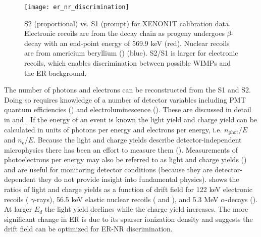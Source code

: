 \begin{figure}
\centering
\texttt{[image: er\_nr\_discrimination]}
\caption[S2 (proportional) vs. S1 (prompt) for XENON1T  and \ambe calibration data.  S2/S1 is larger for electronic recoils,
which enables discrimination
between possible WIMPs and the ER background.]{S2 (proportional) vs. S1 (prompt) for XENON1T calibration data.  Electronic recoils are from
the  decay chain as
progeny  undergoes $\beta$-decay with an end-point energy of 569.9 keV (red).  Nuclear
recoils are from americium beryllium () (blue).  S2/S1 is larger for electronic recoils, which enables discrimination
between possible WIMPs and the ER background.}
\label{fig:tpcs_signals_ernr}
\end{figure}

The number of photons and electrons can be reconstructed from the S1 and S2.  Doing so requires knowledge of a number of detector
variables including PMT quantum efficiencies () and electroluminescence
().  These are discussed in detail in  and
.  If the energy of an event is known the light yield and charge yield can be calculated
in units of photons per energy and electrons per energy, i.e. $n_{\mathrm{phot}}/E$ and $n_{\mathrm{e}}/E$.  Because the light and charge
yields describe detector-independent microphysics there has been an effort to measure them
().  Measurements of photoelectrons per energy may also be referred to as light and charge
yields () and are useful for monitoring detector conditions (because they are detector-dependent they do not
provide insight into fundamental physics).   shows the ratios of light and
charge yields as a function of drift field for 122 keV electronic recoils ( $\gamma$-rays), 56.5 keV elastic nuclear recoils
( and ), and
5.3 MeV $\alpha$-decays ().  At larger $E_d$ the light yield declines while the charge yield increases.  The more
significant change in ER is due to its sparser ionization density and suggests the drift field can be optimized for ER-NR discrimination.

